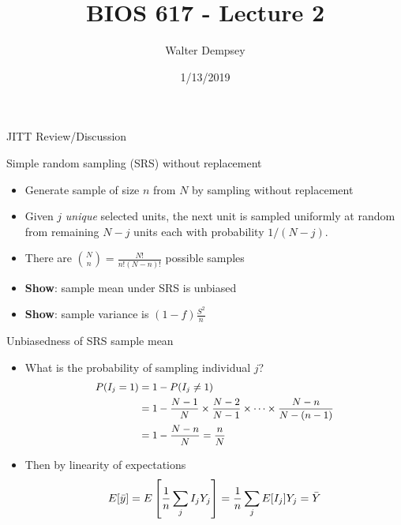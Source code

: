 \documentclass[
  ignorenonframetext,
]{beamer}
\title{BIOS 617 - Lecture 2}
\author{Walter Dempsey}
\date{1/13/2019}
\providecommand{\tightlist}{%
  \setlength{\itemsep}{0pt}\setlength{\parskip}{0pt}}
\begin{document}
\frame{\titlepage}

\begin{frame}{JITT Review/Discussion}
\protect\hypertarget{jitt-reviewdiscussion}{}

\end{frame}

\begin{frame}{Simple random sampling (SRS) without replacement}
\protect\hypertarget{simple-random-sampling-srs-without-replacement}{}

\begin{itemize}
\tightlist
\item
  Generate sample of size \(n\) from \(N\) by sampling without
  replacement
\item
  Given \(j\) \emph{unique} selected units, the next unit is sampled
  uniformly at random from remaining \(N-j\) units each with probability
  \(1/(N-j)\).
\item
  There are \({N \choose n} = \frac{N!}{n! (N-n)!}\) possible samples
\item
  \textbf{Show}: sample mean under SRS is unbiased
\item
  \textbf{Show}: sample variance is \((1-f) \frac{S^2}{n}\)
\end{itemize}

\end{frame}

\begin{frame}{Unbiasedness of SRS sample mean}
\protect\hypertarget{unbiasedness-of-srs-sample-mean}{}

\begin{itemize}
\tightlist
\item
  What is the probability of sampling individual \(j\)? \[\small
  \begin{aligned}
  P(I_j = 1) &= 1 - P(I_j \neq 1) \\
  &= 1 - \frac{N-1}{N} \times \frac{N-2}{N-1} \times \cdots \times \frac{N-n}{N-(n-1)} \\
  &= 1 - \frac{N-n}{N} = \frac{n}{N}
  \end{aligned}
  \]
\item
  Then by linearity of expectations \[\small
  E [ \bar y ] = E \left[ \frac{1}{n} \sum_j I_j Y_j \right] = \frac{1}{n} \sum_j E [ I_j  ] Y_j = \bar Y
  \]
\end{itemize}

\end{frame}
\end{document}

